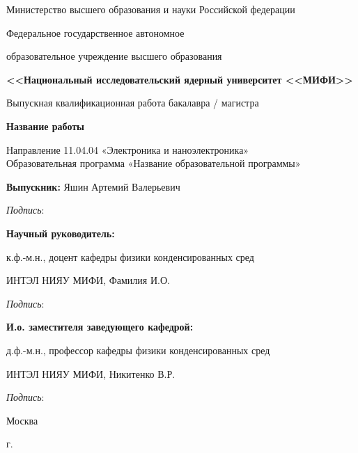 \begin{titlepage}
\begin{center}
{Министерство высшего образования и науки Российской федерации}

{Федеральное государственное автономное}

{образовательное учреждение высшего образования}

{\textbf{<<Национальный исследовательский ядерный университет <<МИФИ>>}}

\vspace{20mm}

Выпускная квалификационная работа бакалавра / магистра

\textbf{\large Название работы}

\vspace{10mm}
Направление 11.04.04 «Электроника и наноэлектроника»\\
Образовательная программа
«Название образовательной программы»

\vspace{10mm}

\begin{flushleft}
\textbf{Выпускник:} Яшин Артемий Валерьевич

\hspace{10cm} \textit{Подпись}: \space \hrulefill

\textbf{Научный руководитель:} 

к.ф.-м.н., доцент кафедры физики конденсированных сред

ИНТЭЛ НИЯУ МИФИ, Фамилия И.О.

\hspace{10cm} \textit{Подпись}: \space \hrulefill

\textbf{И.о. заместителя заведующего кафедрой:} 

д.ф.-м.н., профессор кафедры физики конденсированных сред 

ИНТЭЛ НИЯУ МИФИ, Никитенко В.Р.

\hspace{10cm} \textit{Подпись}: \space \hrulefill \space
\end{flushleft}

\vfill

{Москва}
\par{\the\year{} г.}
\end{center}
\end{titlepage}